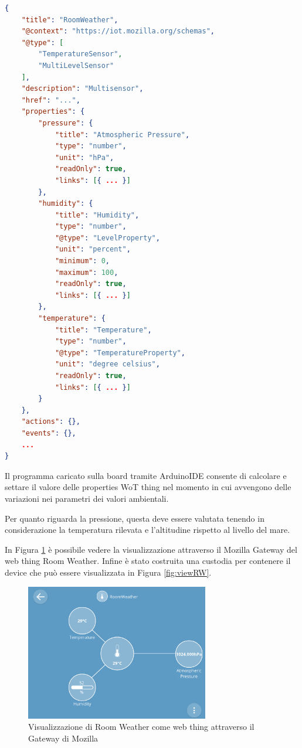 \documentclass{article}
\begin{document}
\bigskip
\begin{lstlisting}[language=json,firstnumber=1]
{
    "title": "RoomWeather",
    "@context": "https://iot.mozilla.org/schemas",
    "@type": [
        "TemperatureSensor",
        "MultiLevelSensor"
    ],
    "description": "Multisensor",
    "href": "...",
    "properties": {
        "pressure": {
            "title": "Atmospheric Pressure",
            "type": "number",
            "unit": "hPa",
            "readOnly": true,
            "links": [{ ... }]
        },
        "humidity": {
            "title": "Humidity",
            "type": "number",
            "@type": "LevelProperty",
            "unit": "percent",
            "minimum": 0,
            "maximum": 100,
            "readOnly": true,
            "links": [{ ... }]
        },
        "temperature": {
            "title": "Temperature",
            "type": "number",
            "@type": "TemperatureProperty",
            "unit": "degree celsius",
            "readOnly": true,
            "links": [{ ... }]
        }
    },
    "actions": {},
    "events": {},
    ...
}
\end{lstlisting}
\bigskip

Il programma caricato sulla board tramite ArduinoIDE consente di calcolare e settare il valore delle properties WoT thing nel momento in cui avvengono delle variazioni nei parametri dei valori ambientali.

Per quanto riguarda la pressione, questa deve essere valutata tenendo in considerazione la temperatura rilevata e l'altitudine rispetto al livello del mare.

In Figura \ref{fig:webthingRW} è possibile vedere la visualizzazione attraverso il Mozilla Gateway del web thing Room Weather. Infine è stato costruita una custodia per contenere il device che può essere visualizzata in Figura \ref{fig:viewRW}.

\begin{figure} [!b]
    \centering
    \includegraphics[width=8cm]{img/RoomWeather.png}
    \caption{Visualizzazione di Room Weather come web thing attraverso il Gateway di Mozilla}
    \label{fig:webthingRW}
\end{figure}
\end{document}
